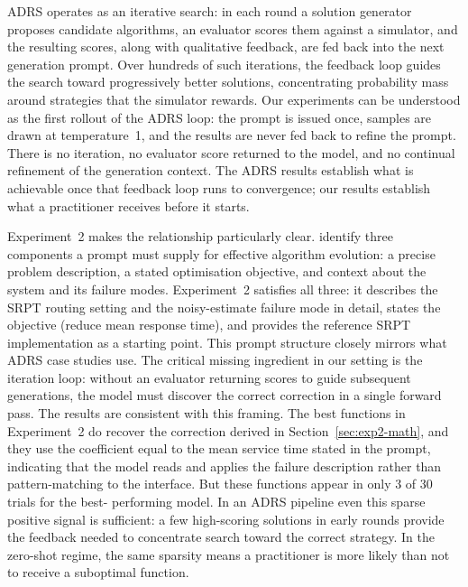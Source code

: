 \documentclass[11pt]{article}
\begin{document}
ADRS operates as an iterative search: in each round a solution
generator proposes candidate algorithms, an evaluator scores them
against a simulator, and the resulting scores, along with
qualitative feedback, are fed back into the next generation prompt.
Over hundreds of such iterations, the feedback loop guides the
search toward progressively better solutions, concentrating
probability mass around strategies that the simulator rewards.
Our experiments can be understood as the first rollout of the ADRS
loop: the prompt is issued once, samples are drawn at temperature~1,
and the results are never fed back to refine the prompt.
There is no iteration, no evaluator score returned to the model, and
no continual refinement of the generation context.
The ADRS results establish what is achievable once that feedback loop
runs to convergence; our results establish what a practitioner
receives before it starts.

Experiment~2 makes the relationship particularly clear.
\citet{cheng2025barbarians} identify three components a prompt must
supply for effective algorithm evolution: a precise problem
description, a stated optimisation objective, and context about the
system and its failure modes.
Experiment~2 satisfies all three: it describes the SRPT routing
setting and the noisy-estimate failure mode in detail, states the
objective (reduce mean response time), and provides the reference
SRPT implementation as a starting point.
This prompt structure closely mirrors what ADRS case studies use.
The critical missing ingredient in our setting is the iteration
loop: without an evaluator returning scores to guide subsequent
generations, the model must discover the correct correction in a
single forward pass.
The results are consistent with this framing.
The best functions in Experiment~2 do recover the correction
derived in Section~\ref{sec:exp2-math}, and they use the
coefficient equal to the mean service time stated in the
prompt, indicating that the model reads and applies the failure
description rather than pattern-matching to the interface.
But these functions appear in only 3 of 30 trials for the best-
performing model.
In an ADRS pipeline even this sparse positive signal is sufficient:
a few high-scoring solutions in early rounds provide the feedback
needed to concentrate search toward the correct strategy.
In the zero-shot regime, the same sparsity means a practitioner is
more likely than not to receive a suboptimal function.
\end{document}
